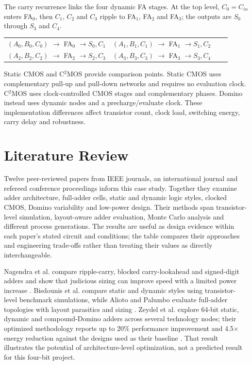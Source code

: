 \documentclass[11pt,a4paper]{article}
\begin{document}
The carry recurrence links the four dynamic FA stages. At the top level, $C_0=C_{in}$ enters FA$_0$, then $C_1$, $C_2$ and $C_3$ ripple to FA$_1$, FA$_2$ and FA$_3$; the outputs are $S_0$ through $S_3$ and $C_4$.
\begin{center}
\setlength{\tabcolsep}{6pt}
\begin{tabular}{c c c c}
$(A_0,B_0,C_0)$ $\longrightarrow$ FA$_0$ $\longrightarrow S_0,C_1$ &
$(A_1,B_1,C_1)$ $\longrightarrow$ FA$_1$ $\longrightarrow S_1,C_2$\\[4pt]
$(A_2,B_2,C_2)$ $\longrightarrow$ FA$_2$ $\longrightarrow S_2,C_3$ &
$(A_3,B_3,C_3)$ $\longrightarrow$ FA$_3$ $\longrightarrow S_3,C_4$
\end{tabular}
\end{center}

Static CMOS and C$^{2}$MOS provide comparison points. Static CMOS uses complementary pull-up and pull-down networks and requires no evaluation clock. C$^{2}$MOS uses clock-controlled CMOS stages and complementary phases. Domino instead uses dynamic nodes and a precharge/evaluate clock. These implementation differences affect transistor count, clock load, switching energy, carry delay and robustness.

\section{Literature Review}
Twelve peer-reviewed papers from IEEE journals, an international journal and refereed conference proceedings inform this case study. Together they examine adder architecture, full-adder cells, static and dynamic logic styles, clocked CMOS, Domino variability and low-power design. Their methods span transistor-level simulation, layout-aware adder evaluation, Monte Carlo analysis and different process generations. The results are useful as design evidence within each paper's stated circuit and conditions; the table compares their approaches and engineering trade-offs rather than treating their values as directly interchangeable.

Nagendra et al. compare ripple-carry, blocked carry-lookahead and signed-digit adders and show that judicious sizing can improve speed with a limited power increase \cite{Nagendra1994}. Bisdounis et al. compare static and dynamic styles using transistor-level benchmark simulations, while Alioto and Palumbo evaluate full-adder topologies with layout parasitics and sizing \cite{Bisdounis1998,Alioto2002}. Zeydel et al. explore 64-bit static, dynamic and compound-Domino adders across several technology nodes; their optimized methodology reports up to 20\% performance improvement and 4.5$\times$ energy reduction against the designs used as their baseline \cite{Zeydel2010}. That result illustrates the potential of architecture-level optimization, not a predicted result for this four-bit project.
\end{document}

